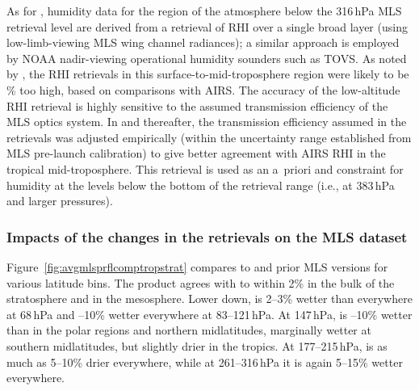 As for \prevv, humidity data for the region of the atmosphere below the 316\,hPa MLS retrieval level are derived from a retrieval of RHI over a single broad layer (using low-limb-viewing MLS wing channel radiances); a similar approach is employed by NOAA nadir-viewing operational humidity sounders such as TOVS\@. As noted by \citet{ReadEtal:2007}, the \vii RHI retrievals in this surface-to-mid-troposphere region were likely to be \% too high, based on comparisons with AIRS\@. The accuracy of the low-altitude RHI retrieval is highly sensitive to the assumed transmission efficiency of the MLS optics system. In \viii and thereafter, the transmission efficiency assumed in the retrievals was adjusted empirically (within the uncertainty range established from MLS pre-launch calibration) to give better agreement with AIRS RHI in the tropical mid-troposphere. This retrieval is used as an a~priori and constraint for humidity at the levels below the bottom of the  retrieval range (i.e., at 383\,hPa and larger pressures).

\subsubsection{Impacts of the changes in the \thisv retrievals on the MLS  dataset}

Figure~\ref{fig:avgmlsprflcomptropstrat} compares \prevv {} to \thisv and prior MLS versions for various latitude bins. The \thisv {} product agrees with \prevv to within 2\% in the bulk of the stratosphere and in the mesosphere.  Lower down, \thisv is 2--3\% wetter than \prevv everywhere at 68\,hPa and --10\% wetter everywhere at 83--121\,hPa. At 147\,hPa, \thisv is --10\% wetter than \prevv in the polar regions and northern midlatitudes, marginally wetter at southern midlatitudes, but slightly drier in the tropics. At 177--215\,hPa, \thisv is as much as 5--10\% drier everywhere, while at 261--316\,hPa it is again 5--15\% wetter everywhere. 

